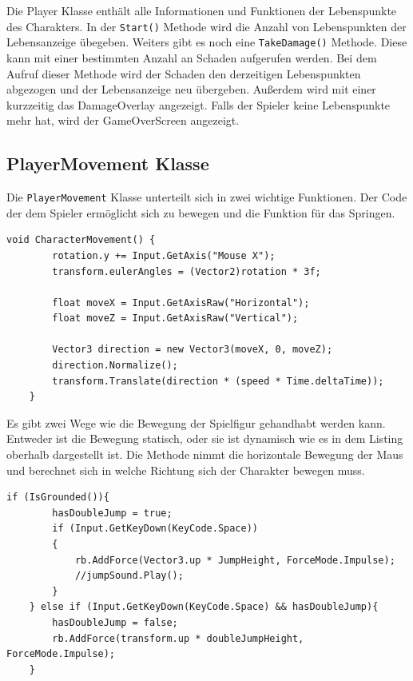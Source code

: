 Die Player Klasse enthält alle Informationen und Funktionen der Lebenspunkte des Charakters. In der \verb+Start()+ Methode wird die Anzahl von Lebenspunkten der Lebensanzeige übegeben. Weiters gibt es noch eine \verb+TakeDamage()+ Methode. Diese kann mit einer bestimmten Anzahl an Schaden aufgerufen werden. Bei dem Aufruf dieser Methode wird der Schaden den derzeitigen Lebenspunkten abgezogen und der Lebensanzeige neu übergeben. Außerdem wird mit einer  kurzzeitig das DamageOverlay angezeigt. Falls der Spieler keine Lebenspunkte mehr hat, wird der GameOverScreen angezeigt.

\pagebreak

\subsection{PlayerMovement Klasse}
Die \verb+PlayerMovement+ Klasse unterteilt sich in zwei wichtige Funktionen. Der Code der dem Spieler ermöglicht sich zu bewegen und die Funktion für das Springen.\\

\begin{lstlisting}[language=CSharp,caption={CharacterMovement der PlayerMovement Klasse.},label=code:charactermovement]
    void CharacterMovement() {
        rotation.y += Input.GetAxis("Mouse X");
        transform.eulerAngles = (Vector2)rotation * 3f;
        
        float moveX = Input.GetAxisRaw("Horizontal");
        float moveZ = Input.GetAxisRaw("Vertical");
    
        Vector3 direction = new Vector3(moveX, 0, moveZ);
        direction.Normalize();
        transform.Translate(direction * (speed * Time.deltaTime));
    }
\end{lstlisting}

Es gibt zwei Wege wie die Bewegung der Spielfigur gehandhabt werden kann. Entweder ist die Bewegung statisch, oder sie ist dynamisch wie es in dem Listing oberhalb dargestellt ist. Die Methode nimmt die horizontale Bewegung der Maus und berechnet sich in welche Richtung sich der Charakter bewegen muss.\\

\begin{lstlisting}[language=CSharp,caption={Jump \& DoubleJump der PlayerMovement Klasse.},label=code:player]
    if (IsGrounded()){
        hasDoubleJump = true;
        if (Input.GetKeyDown(KeyCode.Space))
        {
            rb.AddForce(Vector3.up * JumpHeight, ForceMode.Impulse);
            //jumpSound.Play();
        }
    } else if (Input.GetKeyDown(KeyCode.Space) && hasDoubleJump){
        hasDoubleJump = false;
        rb.AddForce(transform.up * doubleJumpHeight, ForceMode.Impulse);
    }
\end{lstlisting}

